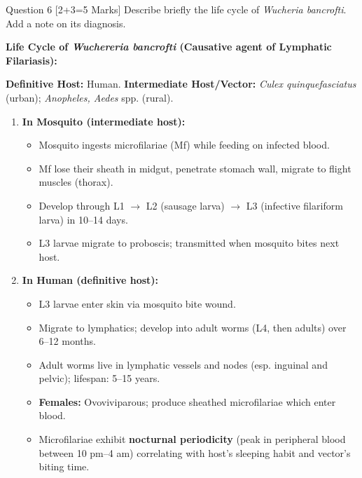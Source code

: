 \documentclass[11pt,a4paper]{article}
\begin{document}
\begin{qbox}{Question 6 [2+3=5 Marks]}
Describe briefly the life cycle of \textit{Wucheria bancrofti}. Add a note on its diagnosis.
\end{qbox}

\begin{ansbox}
\textbf{Life Cycle of \textit{Wuchereria bancrofti} (Causative agent of Lymphatic Filariasis):}

\textbf{Definitive Host:} Human. \textbf{Intermediate Host/Vector:} \textit{Culex quinquefasciatus} (urban); \textit{Anopheles, Aedes} spp. (rural).

\begin{enumerate}[leftmargin=*]
    \item \textbf{In Mosquito (intermediate host):}
    \begin{itemize}
        \item Mosquito ingests microfilariae (Mf) while feeding on infected blood.
        \item Mf lose their sheath in midgut, penetrate stomach wall, migrate to flight muscles (thorax).
        \item Develop through L1 $\rightarrow$ L2 (sausage larva) $\rightarrow$ L3 (infective filariform larva) in 10--14 days.
        \item L3 larvae migrate to proboscis; transmitted when mosquito bites next host.
    \end{itemize}
    \item \textbf{In Human (definitive host):}
    \begin{itemize}
        \item L3 larvae enter skin via mosquito bite wound.
        \item Migrate to lymphatics; develop into adult worms (L4, then adults) over 6--12 months.
        \item Adult worms live in lymphatic vessels and nodes (esp. inguinal and pelvic); lifespan: 5--15 years.
        \item \textbf{Females:} Ovoviviparous; produce sheathed microfilariae which enter blood.
        \item Microfilariae exhibit \textbf{nocturnal periodicity} (peak in peripheral blood between 10 pm--4 am) correlating with host's sleeping habit and vector's biting time.
    \end{itemize}
\end{enumerate}


\end{ansbox}
\end{document}
